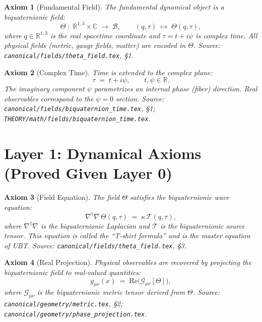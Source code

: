 \documentclass[11pt,a4paper]{article}
\newtheorem{axiom}{Axiom}
\begin{document}
\begin{axiom}[Fundamental Field]\label{ax:field}
The fundamental dynamical object is a biquaternionic field:
\begin{equation}
  \Theta \;:\; \mathbb{R}^{1,3}\times\mathbb{C} \;\longrightarrow\; \mathcal{B},
  \qquad
  (q,\tau) \;\mapsto\; \Theta(q,\tau),
\end{equation}
where $q\in\mathbb{R}^{1,3}$ is the real spacetime coordinate and
$\tau = t + i\psi$ is complex time.
All physical fields (metric, gauge fields, matter) are encoded in $\Theta$.
\emph{Source}: \texttt{canonical/fields/theta\_field.tex}, \S1.
\end{axiom}

\begin{axiom}[Complex Time]\label{ax:complextime}
Time is extended to the complex plane:
\begin{equation}
  \tau \;=\; t + i\psi, \qquad t,\psi \in \mathbb{R}.
\end{equation}
The imaginary component $\psi$ parametrizes an internal phase (fiber) direction.
Real observables correspond to the $\psi=0$ section.
\emph{Source}: \texttt{canonical/fields/biquaternion\_time.tex}, \S1;
\texttt{THEORY/math/fields/biquaternion\_time.tex}.
\end{axiom}

\section{Layer 1: Dynamical Axioms (Proved Given Layer 0)}

\begin{axiom}[Field Equation]\label{ax:fieldeq}
The field $\Theta$ satisfies the biquaternionic wave equation:
\begin{equation}\label{eq:tshirt}
  \nabla^\dagger \nabla\,\Theta(q,\tau) \;=\; \kappa\,\mathcal{T}(q,\tau),
\end{equation}
where $\nabla^\dagger\nabla$ is the biquaternionic Laplacian and $\mathcal{T}$
is the biquaternionic source tensor.
This equation is called the ``T-shirt formula'' and is the master equation of UBT.
\emph{Source}: \texttt{canonical/fields/theta\_field.tex}, \S3.
\end{axiom}

\begin{axiom}[Real Projection]\label{ax:projection}
Physical observables are recovered by projecting the biquaternionic field
to real-valued quantities:
\begin{equation}
  g_{\mu\nu}(x) \;=\; \mathrm{Re}\bigl(\mathcal{G}_{\mu\nu}[\Theta]\bigr),
\end{equation}
where $\mathcal{G}_{\mu\nu}$ is the biquaternionic metric tensor derived from $\Theta$.
\emph{Source}: \texttt{canonical/geometry/metric.tex}, \S2;
\texttt{canonical/geometry/phase\_projection.tex}.
\end{axiom}
\end{document}
